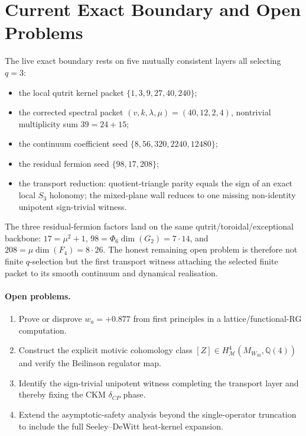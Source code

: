 \documentclass[12pt,a4paper]{article}
\begin{document}











\section{Current Exact Boundary and Open Problems}
\label{sec:boundary}

The live exact boundary rests on five mutually consistent layers all selecting
$q=3$:
\begin{itemize}
\item the local qutrit kernel packet $\{1,3,9,27,40,240\}$;
\item the corrected spectral packet $(v,k,\lambda,\mu)=(40,12,2,4)$,
  nontrivial multiplicity sum $39=24+15$;
\item the continuum coefficient seed $\{8,56,320,2240,12480\}$;
\item the residual fermion seed $\{98,17,208\}$;
\item the transport reduction: quotient-triangle parity equals the sign of
  an exact local $S_3$ holonomy; the mixed-plane wall reduces to one missing
  non-identity unipotent sign-trivial witness.
\end{itemize}
The three residual-fermion factors land on the same qutrit/toroidal/exceptional
backbone: $17=\mu^2+1$, $98=\Phi_6\dim(G_2)=7\cdot14$, and
$208=\mu\dim(F_4)=8\cdot26$.
The honest remaining open problem is therefore not finite $q$-selection but
the first transport witness attaching the selected finite packet to its smooth
continuum and dynamical realisation.

\paragraph{Open problems.}
\begin{enumerate}
\item Prove or disprove $w_a=+0.877$ from first principles in a
  lattice/functional-RG computation.
\item Construct the explicit motivic cohomology class
  $[Z]\in H^4_\mathcal{M}(M_{W_{33}},\mathbb{Q}(4))$ and verify the
  Beilinson regulator map.
\item Identify the sign-trivial unipotent witness completing the transport
  layer and thereby fixing the CKM $\delta_{CP}$ phase.
\item Extend the asymptotic-safety analysis beyond the single-operator
  truncation to include the full Seeley--DeWitt heat-kernel expansion.
\end{enumerate}
\end{document}
